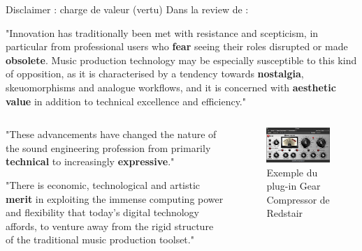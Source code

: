 \documentclass[9pt, aspectratio=169]{beamer}
\begin{document}
\begin{frame}{Disclaimer : charge de valeur (vertu)} %
Dans la review de \cite{de_man_ten_2017} :

\vspace{.8cm}
"Innovation has traditionally been met with resistance and scepticism, in particular from professional users who \textbf{fear} seeing their roles disrupted or made \textbf{obsolete}.
Music production technology may be especially susceptible to this kind of opposition, as it is characterised by a tendency towards \textbf{nostalgia}, skeuomorphisms and analogue workflows, and it is concerned with \textbf{aesthetic value} in addition to technical excellence and efficiency."

\begin{columns}
    \begin{column}{0.58\textwidth}
		
"These advancements have changed the nature of the sound engineering profession from primarily \textbf{technical} to increasingly \textbf{expressive}."

\vspace{.8cm}

"There is economic, technological and artistic \textbf{merit} in exploiting the immense computing power and flexibility that today’s digital technology affords, to venture away from the rigid structure of the traditional music production toolset."
    \end{column}
    \begin{column}{0.4\textwidth}
    \begin{figure}
		\includegraphics[width=\textwidth]{fig/Redstair_GEARcompressor.png}
		\caption{Exemple du plug-in Gear Compressor de Redstair}    
    \end{figure}
    \end{column}
\end{columns}

\end{frame}
\end{document}
